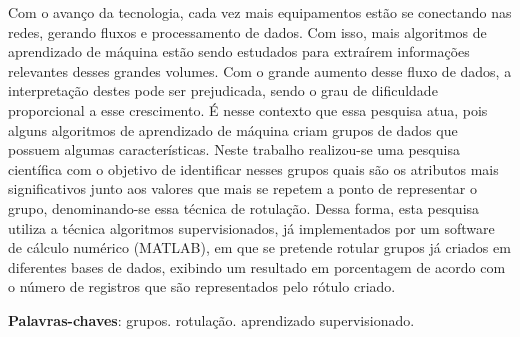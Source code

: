\begin{resumo}
Com o avanço da tecnologia, cada vez mais equipamentos estão se conectando nas redes, gerando fluxos e processamento de dados. Com isso, mais algoritmos de aprendizado de máquina estão sendo estudados para extraírem informações relevantes desses grandes volumes. Com o grande aumento desse fluxo de dados, a interpretação destes pode ser prejudicada, sendo o grau de dificuldade proporcional a esse crescimento. É nesse contexto que essa pesquisa atua, pois alguns algoritmos de aprendizado de máquina criam grupos de dados que possuem algumas características. Neste trabalho realizou-se uma pesquisa científica com o objetivo de identificar nesses grupos quais são os atributos mais significativos junto aos valores que mais se repetem a ponto de representar o grupo, denominando-se essa técnica de rotulação. Dessa forma, esta pesquisa utiliza a técnica algoritmos supervisionados, já implementados por um software de cálculo numérico (MATLAB), em que se pretende rotular grupos já criados em diferentes bases de dados, exibindo um resultado em porcentagem de acordo com o número de registros que são representados pelo rótulo criado. 


  \textbf{Palavras-chaves}: grupos. rotulação. aprendizado supervisionado. 
\end{resumo}

